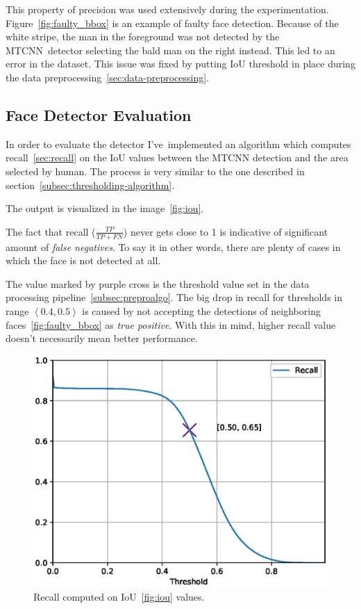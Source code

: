 This property of precision was used extensively during the experimentation.
Figure~\ref{fig:faulty_bbox} is an example of faulty face detection.
Because of the white stripe, the man in the foreground was not detected by the MTCNN detector selecting the bald man
on the right instead.
This led to an error in the dataset.
This issue was fixed by putting IoU threshold in place during the data preprocessing~\ref{sec:data-preprocessing}.

\subsection{Face Detector Evaluation}\label{subsec:detectorevaluation}
In order to evaluate the detector I've implemented an algorithm which computes recall~\ref{sec:recall} on the IoU
values between the MTCNN detection and the area selected by human.
The process is very similar to the one described in section~\ref{subsec:thresholding-algorithm}.

The output is visualized in the image~\ref{fig:iou}.

The fact that recall ($\frac{TP}{TP+FN}$) never gets close to 1 is indicative of significant amount of
\textit{false negatives}.
To say it in other words, there are plenty of cases in which the face is not detected at all.

The value marked by purple cross is the threshold value set in the data processing pipeline~\ref{subsec:preproalgo}.
The big drop in recall for thresholds in range $\left< 0.4, 0.5 \right>$ is caused by not accepting the detections
of neighboring faces~\ref{fig:faulty_bbox} as \textit{true positive}.
With this in mind, higher recall value doesn't necessarily mean better performance.

\begin{figure}[H]
    \centering
    \includegraphics[width=0.95\columnwidth]{images/implementation/mtcnn_recall_fav-128_N1.eps}
    \caption{Recall computed on IoU~\ref{fig:iou} values.}
    \label{fig:mtcnn_recall}
\end{figure}

